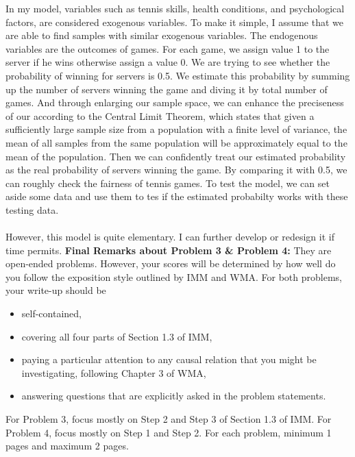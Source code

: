 \documentclass[12pt]{article}
\begin{document}
In my model, variables such as tennis skills, health conditions, and psychological factors, are considered exogenous variables. To make it simple, I assume that we are able to find samples with similar exogenous variables. The endogenous variables are the outcomes of games. For each game, we assign value 1 to the server if he wins otherwise assign a value 0. We are trying to see whether the probability of winning for servers is 0.5. We estimate this probability by summing up the number of servers winning the game and diving it by total number of games. And through enlarging our sample space, we can enhance the preciseness of our according to the Central Limit Theorem, which states that given a sufficiently large sample size from a population with a finite level of variance, the mean of all samples from the same population will be approximately equal to the mean of the population. Then we can confidently treat our estimated probability as the real probability of servers winning the game. By comparing it with 0.5, we can roughly check the fairness of tennis games. To test the model, we can set aside some data and use them to tes if the estimated probabilty works with these testing data.
\\
\\
However, this model is quite elementary. I can further develop or redesign it if time permits.
\vskip0.25in
\noindent\textbf{Final Remarks about Problem 3 \& Problem 4:} 
They are open-ended problems.  However, your scores will be determined
by how well do you follow the exposition style outlined by IMM and
WMA.  For both problems, your write-up should be 
\begin{itemize}
\item self-contained,
\item covering all four parts of Section 1.3 of IMM,
\item paying a particular attention to any causal relation that you
  might be investigating, following Chapter 3 of WMA,
\item answering questions that are explicitly asked in the problem statements.
\end{itemize}
For Problem 3, focus mostly on Step 2 and Step 3 of Section
1.3 of IMM.  For Problem 4, focus mostly on Step 1 and Step
2.  For each problem, minimum 1 pages and maximum 2 pages.
\end{document}
